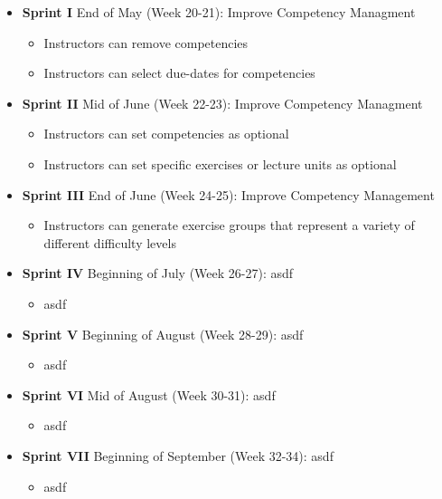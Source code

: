 \documentclass[a4paper,12pt,twoside]{article}
\begin{document}
\begin{itemize}
        \item \textbf{Sprint I} End of May (Week 20-21): Improve Competency Managment
              \begin{itemize}
                      \item Instructors can remove competencies
                      \item Instructors can select due-dates for competencies
              \end{itemize}

        \item \textbf{Sprint II} Mid of June (Week 22-23): Improve Competency Managment
              \begin{itemize}
                      \item Instructors can set competencies as optional
                      \item Instructors can set specific exercises or lecture units as optional
              \end{itemize}

        \item \textbf{Sprint III} End of June (Week 24-25): Improve Competency Management
              \begin{itemize}
                      \item Instructors can generate exercise groups that represent a variety of different difficulty levels
              \end{itemize}

        \item \textbf{Sprint IV} Beginning of July (Week 26-27): asdf
              \begin{itemize}
                      \item asdf
              \end{itemize}

        \item \textbf{Sprint V} Beginning of August (Week 28-29): asdf
              \begin{itemize}
                      \item asdf
              \end{itemize}

        \item \textbf{Sprint VI} Mid of August (Week 30-31): asdf
              \begin{itemize}
                      \item asdf
              \end{itemize}

        \item \textbf{Sprint VII} Beginning of September (Week 32-34): asdf
              \begin{itemize}
                      \item asdf
              \end{itemize}
\end{itemize}

\clearpage

\clearpage


\end{document}
